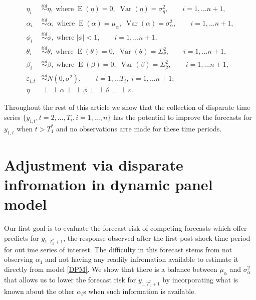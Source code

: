 \documentclass[11pt]{article}
\newcommand{\indep}{\perp\!\!\!\perp}
\DeclareMathOperator{\E}{E}
\DeclareMathOperator{\Var}{Var}
\begin{document}
\begin{align*}
  \eta_i &\overset{iid}{\sim} \eta,\; \text{where}\; \E(\eta) = 0,\; \Var(\eta) = \sigma_\eta^2, 
    \qquad i = 1,\ldots n+1, \\
  \alpha_i &\overset{iid}{\sim} \alpha,\; \text{where}\; \E(\alpha) = \mu_\alpha,\; 
    \Var(\alpha) = \sigma_\alpha^2, \qquad i = 1,\ldots n+1, \\
  \phi_i &\overset{iid}{\sim} \phi,\; \text{where}\; |\phi| < 1, 
    \qquad i = 1,\ldots n+1, \\
  \theta_i &\overset{iid}{\sim} \theta,\; \text{where}\; \E(\theta) = 0,\; 
    \Var(\theta) = \Sigma_\theta^2, \qquad i = 1,\ldots n+1, \\
  \beta_i &\overset{iid}{\sim} \beta,\; \text{where}\; \E(\beta) = 0,\; 
    \Var(\beta) = \Sigma_\beta^2, \qquad i = 1,\ldots n+1, \\    
  \varepsilon_{i,t} &\overset{iid}{\sim} N(0, \sigma^2), 
    \qquad t = 1, \ldots T_i,\; i = 1,\ldots n+1; \\
  \eta &\indep \alpha \indep \phi \indep \theta \indep \varepsilon.
\end{align*}

Throughout the rest of this article we show that the collection of 
disparate time series $\{y_{i,t}, t = 2,\ldots,T_i, i = 1,\ldots,n\}$ has 
the potential to improve the forecasts for $y_{1, t}$ when $t > T_1^*$ 
and no observations arre made for these time periods.


\section{Adjustment via disparate infromation in dynamic panel model}

Our first goal is to evaluate the forecast risk of competing forecasts which 
offer predicts for $y_{1, T_1^* + 1}$, the response observed after the first 
post shock time period for out ime series of interest.  
The difficulty in this forecast stems from not observing $\alpha_1$ and not 
having any readily infromation available to estimate it directly from 
model \eqref{DPM}.  We show that there is a balance between $\mu_\alpha$ 
and $\sigma_\alpha^2$ that allows us to lower the forecast risk for 
$y_{1, T_1^* + 1}$ by incorporating what is known about the other $\alpha_i$s 
when such information is available.
\end{document}
